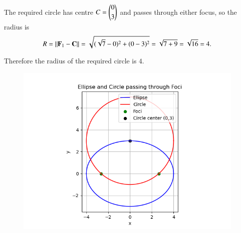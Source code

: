 \documentclass[journal]{IEEEtran}
\begin{document}
The required circle has centre \(C=\begin{pmatrix}0\\[2pt]3\end{pmatrix}\) and passes through either focus, so the radius is
\[
R=\left\lVert\mathbf F_1-\mathbf C\right\rVert
=\sqrt{(\sqrt7-0)^2+(0-3)^2}
=\sqrt{7+9}
=\sqrt{16}=4.
\]

Therefore the radius of the required circle is
\(
\boxed{4}.
\)


 \begin{figure}[H]
     \centering
     \includegraphics[width=0.8\columnwidth]{figs/15.png}
     \label{fig:1}
 \end{figure}
\end{document}
